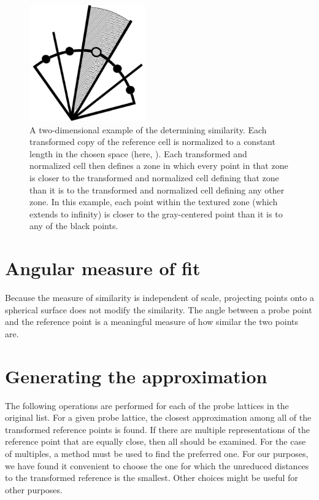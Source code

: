 \documentclass[preprint]{iucr}              %
\numberwithin{equation}{section}
\numberwithin{equation}{section}
\begin{document}
	\begin{figure}
		\label{zone}
		\includegraphics[height=5cm]{zone2a}
		\caption{A two-dimensional example of the determining similarity. Each transformed copy of the reference cell
			is normalized to a constant length in the chosen space (here, \SVI{}). Each transformed and normalized cell then 
			defines a zone in which every point in that zone is closer to the transformed and normalized cell defining that zone than it is
			to the transformed and normalized cell defining any other zone.  In this example, each point within the textured zone (which extends
			to infinity) is closer to the
			gray-centered point than it is to any of the black points.}
	\end{figure}

\section{Angular measure of fit}

Because the measure of similarity is independent of scale, projecting
points onto a spherical surface does not modify the similarity. The
angle between a probe point and the reference point is a meaningful measure of how
similar the two points are.
	
	\section{Generating the approximation}
	
	The following operations are performed for each of the probe lattices in 
	the original list.  For a given probe lattice, the closest approximation among all of the 
	transformed reference points is found. If there are multiple representations of the 
	reference point that are equally close, then all should be examined. For the case of multiples, a
	method must be used to find the preferred one. For our purposes, we have found
	it convenient to choose the one for which the unreduced \GVI{} distances to the transformed
	reference is the smallest. Other choices might be useful for other purposes.
	
\end{document}
